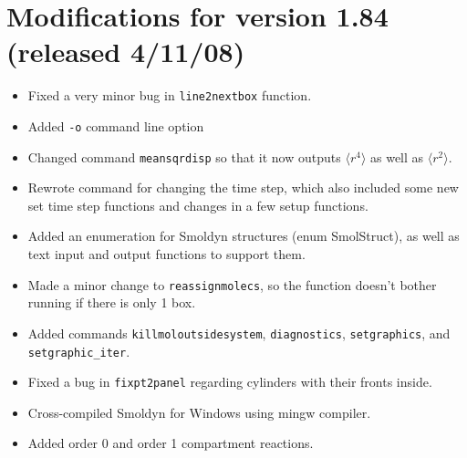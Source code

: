 \documentclass {scrbook}
\newcommand {\ttt} {\texttt}
\begin{document}
\section{Modifications for version 1.84 (released 4/11/08)}
\begin{itemize}
\item Fixed a very minor bug in \ttt{line2nextbox} function.
\item Added \ttt{-o} command line option
\item Changed command \ttt{meansqrdisp} so that it now outputs $\langle r^4\rangle$ as well as $\langle r^2\rangle$.
\item Rewrote command for changing the time step, which also included some new set time step functions and changes in a few setup functions.
\item Added an enumeration for Smoldyn structures (enum SmolStruct), as well as text input and output functions to support them.
\item Made a minor change to \ttt{reassignmolecs}, so the function doesn't bother running if there is only 1 box.
\item Added commands \ttt{killmoloutsidesystem}, \ttt{diagnostics}, \ttt{setgraphics}, and \ttt{setgraphic\_iter}.
\item Fixed a bug in \ttt{fixpt2panel} regarding cylinders with their fronts inside.
\item Cross-compiled Smoldyn for Windows using mingw compiler.
\item Added order 0 and order 1 compartment reactions.
\end{itemize}
\end{document}
